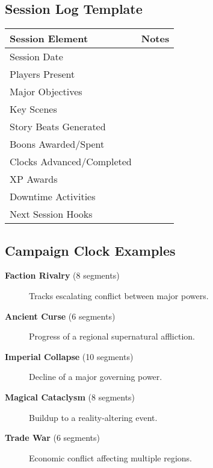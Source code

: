 \subsection{Session Log Template}
\label{subsec:session-log-template}

\begin{center}
\feTableStart
\begin{tabularx}{\linewidth}{@{}p{4cm} Y @{}}
\toprule
\textbf{Session Element} & \textbf{Notes} \\
\midrule
Session Date & \\
Players Present & \\
Major Objectives & \\
Key Scenes & \\
Story Beats Generated & \\
Boons Awarded/Spent & \\
Clocks Advanced/Completed & \\
XP Awards & \\
Downtime Activities & \\
Next Session Hooks & \\
\bottomrule
\end{tabularx}
\feTableEnd
\end{center}

\subsection{Campaign Clock Examples}
\label{subsec:campaign-clocks}

\begin{description}
\item[\textbf{Faction Rivalry} (8 segments)] Tracks escalating conflict between major powers.
\item[\textbf{Ancient Curse} (6 segments)] Progress of a regional supernatural affliction.
\item[\textbf{Imperial Collapse} (10 segments)] Decline of a major governing power.
\item[\textbf{Magical Cataclysm} (8 segments)] Buildup to a reality-altering event.
\item[\textbf{Trade War} (6 segments)] Economic conflict affecting multiple regions.
\end{description}

